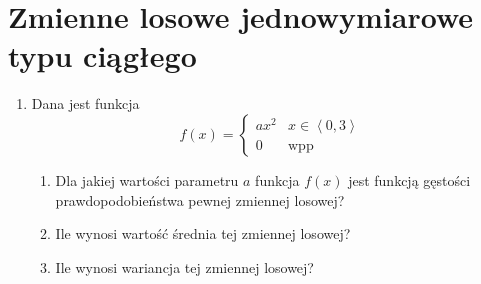 \documentclass[twoside]{mwart}
\newcommand{\ans}[1]{}
\newcommand{\ans}[1]{\par\emph{Odpowiedź:} #1}
\begin{document}
\clearpage
\section{Zmienne losowe jednowymiarowe typu ciągłego}

\begin{enumerate}
\item Dana jest funkcja 
\[ f(x)=\begin{cases} ax^2 & x\in \left<0,3\right> \\ 0 & \text{wpp} \end{cases} \]
\begin{enumerate}
\item Dla jakiej wartości parametru $a$ funkcja $f(x)$ jest funkcją gęstości prawdopodobieństwa pewnej zmiennej losowej?
\item Ile wynosi wartość średnia tej zmiennej losowej?
\item Ile wynosi wariancja tej zmiennej losowej?
\end{enumerate}

\end{enumerate}
\end{document}
